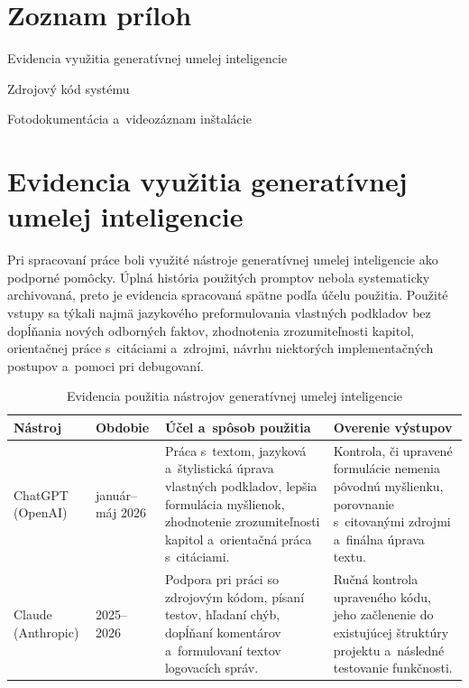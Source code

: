 \chapter*{Zoznam príloh}

\begin{description}[leftmargin=3cm, labelwidth=3cm, labelsep=1em, font=\bfseries]

    \item[Príloha A] Evidencia využitia generatívnej umelej inteligencie

    \item[Príloha B] Zdrojový kód systému

    \item[Príloha C] Fotodokumentácia a~videozáznam inštalácie

\end{description}


\appendix

\chapter{Evidencia využitia generatívnej umelej inteligencie}
\label{priloha:ai-evidencia}

Pri spracovaní práce boli využité nástroje generatívnej umelej inteligencie
ako podporné pomôcky. Úplná história použitých promptov nebola systematicky
archivovaná, preto je evidencia spracovaná spätne podľa účelu použitia.
Použité vstupy sa týkali najmä jazykového preformulovania vlastných
podkladov bez dopĺňania nových odborných faktov, zhodnotenia
zrozumiteľnosti kapitol, orientačnej práce s~citáciami a~zdrojmi,
návrhu niektorých implementačných postupov a~pomoci pri debugovaní.

\begin{table}[H]
    \centering
    \small
    \begin{tabular}{|p{2.7cm}|p{2.0cm}|p{5.0cm}|p{3.9cm}|}
        \hline
        \textbf{Nástroj} & \textbf{Obdobie} & \textbf{Účel a~spôsob použitia} & \textbf{Overenie výstupov} \\
        \hline
        ChatGPT (OpenAI) & január--máj 2026 &
        Práca s~textom, jazyková a~štylistická úprava vlastných podkladov,
        lepšia formulácia myšlienok, zhodnotenie zrozumiteľnosti kapitol
        a~orientačná práca s~citáciami. &
        Kontrola, či upravené formulácie nemenia pôvodnú myšlienku,
        porovnanie s~citovanými zdrojmi a~finálna úprava textu. \\
        \hline
        Claude (Anthropic) & 2025--2026 &
        Podpora pri práci so zdrojovým kódom, písaní testov, hľadaní chýb,
        dopĺňaní komentárov a~formulovaní textov logovacích správ. &
        Ručná kontrola upraveného kódu, jeho začlenenie do existujúcej
        štruktúry projektu a~následné testovanie funkčnosti. \\
        \hline
    \end{tabular}
    \caption{Evidencia použitia nástrojov generatívnej umelej inteligencie}
    \label{tab:ai-evidencia}
\end{table}


